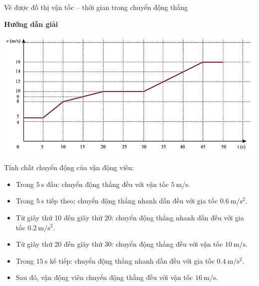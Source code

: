 \begin{dang}{Vẽ được đồ thị vận tốc – thời gian trong chuyển động thẳng}
{\begin{center}
			\textbf{Hướng dẫn giải}
		\end{center}
		\begin{center}
			\includegraphics[width=0.8\linewidth]{../figs/VN10-2023-PH-TP008-6}
		\end{center}
	Tính chất chuyển động của vận động viên:
	\begin{itemize}
		\item Trong $\SI{5}{\second}$ đầu: chuyển động thẳng đều với vận tốc $\SI{5}{\meter/\second}$.
		\item Trong $\SI{5}{\second}$ tiếp theo: chuyển động thẳng nhanh dần đều với gia tốc $\SI{0.6}{\meter/\second^2}$.
		\item Từ giây thứ 10 đến giây thứ 20: chuyển động thẳng nhanh dần đều với gia tốc $\SI{0.2}{\meter/\second^2}$.
		\item Từ giây thứ 20 đến giây thứ 30: chuyển động thẳng đều với vận tốc $\SI{10}{\meter/\second}$.
		\item Trong $\SI{15}{\second}$ kế tiếp: chuyển động thẳng nhanh dần đều với gia tốc $\SI{0.4}{\meter/\second^2}$.
		\item Sau đó, vận động viên chuyển động thẳng đều với vận tốc $\SI{16}{\meter/\second}$.
		\end{itemize}
	}
	
\end{dang}

